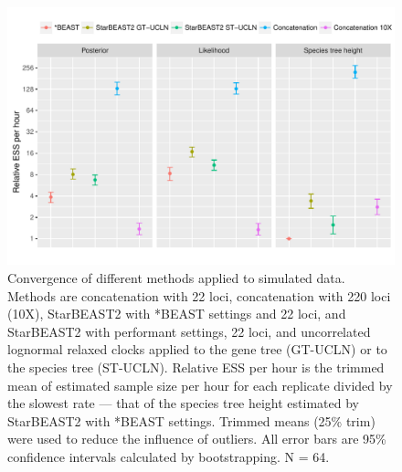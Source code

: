 \documentclass[12pt]{article}
\begin{document}
\clearpage

\begin{figure}[htb!]
\centering
\includegraphics[width=16cm]{multiple_ess_per_hour.pdf}
\caption
{Convergence of different methods applied to simulated data. Methods are
concatenation with 22 loci, concatenation with 220 loci (10X), StarBEAST2 with
*BEAST settings and 22 loci, and StarBEAST2 with performant settings, 22 loci,
and uncorrelated lognormal relaxed clocks applied to the gene tree (GT-UCLN) or
to the species tree (ST-UCLN). Relative ESS per hour is the trimmed mean of
estimated sample size per hour for each replicate divided by the slowest rate
--- that of the species tree height estimated by StarBEAST2 with *BEAST
settings. Trimmed means (25\% trim) were used to reduce the influence of
outliers. All error bars are 95\% confidence intervals calculated by
bootstrapping. N = 64.}
\label{fig:simulatedEssPerHour}
\end{figure}

\clearpage
\end{document}
